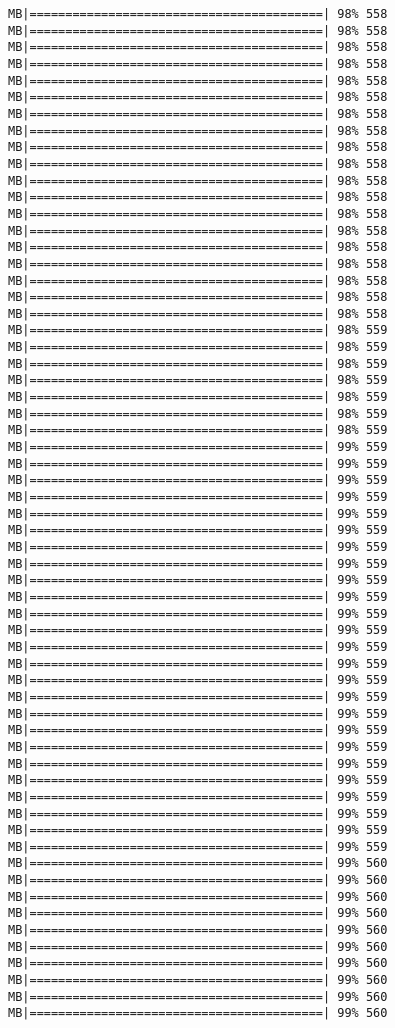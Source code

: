 \documentclass[
]{article}
\begin{document}
\begin{verbatim}
MB|=========================================| 98% 558 MB|=========================================| 98% 558 MB|=========================================| 98% 558 MB|=========================================| 98% 558 MB|=========================================| 98% 558 MB|=========================================| 98% 558 MB|=========================================| 98% 558 MB|=========================================| 98% 558 MB|=========================================| 98% 558 MB|=========================================| 98% 558 MB|=========================================| 98% 558 MB|=========================================| 98% 558 MB|=========================================| 98% 558 MB|=========================================| 98% 558 MB|=========================================| 98% 558 MB|=========================================| 98% 558 MB|=========================================| 98% 558 MB|=========================================| 98% 558 MB|=========================================| 98% 558 MB|=========================================| 98% 559 MB|=========================================| 98% 559 MB|=========================================| 98% 559 MB|=========================================| 98% 559 MB|=========================================| 98% 559 MB|=========================================| 98% 559 MB|=========================================| 98% 559 MB|=========================================| 99% 559 MB|=========================================| 99% 559 MB|=========================================| 99% 559 MB|=========================================| 99% 559 MB|=========================================| 99% 559 MB|=========================================| 99% 559 MB|=========================================| 99% 559 MB|=========================================| 99% 559 MB|=========================================| 99% 559 MB|=========================================| 99% 559 MB|=========================================| 99% 559 MB|=========================================| 99% 559 MB|=========================================| 99% 559 MB|=========================================| 99% 559 MB|=========================================| 99% 559 MB|=========================================| 99% 559 MB|=========================================| 99% 559 MB|=========================================| 99% 559 MB|=========================================| 99% 559 MB|=========================================| 99% 559 MB|=========================================| 99% 559 MB|=========================================| 99% 559 MB|=========================================| 99% 559 MB|=========================================| 99% 559 MB|=========================================| 99% 559 MB|=========================================| 99% 560 MB|=========================================| 99% 560 MB|=========================================| 99% 560 MB|=========================================| 99% 560 MB|=========================================| 99% 560 MB|=========================================| 99% 560 MB|=========================================| 99% 560 MB|=========================================| 99% 560 MB|=========================================| 99% 560 MB|=========================================| 99% 560 
\end{verbatim}
\end{document}
